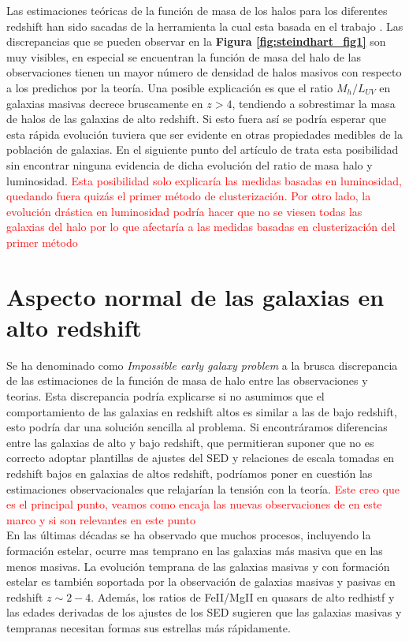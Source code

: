 \documentclass{article}
\begin{document}
Las estimaciones teóricas de la función de masa de los halos para los diferentes redshift han sido sacadas de la herramienta \cite{murray2013hmfcalc} la cual esta basada en el trabajo \cite{sheth2001ellipsoidal}. Las discrepancias que se pueden observar en la \textbf{Figura \ref{fig:steindhart_fig1}} son muy visibles, en especial se encuentran la función de masa del halo de las observaciones tienen un mayor número de densidad de halos masivos con respecto a los predichos por la teoría. Una posible explicación es que el ratio $M_h/L_{UV}$ en galaxias masivas decrece bruscamente en $z>4$, tendiendo a sobrestimar la masa de halos de las galaxias de alto redshift. Si esto fuera así se podría esperar que esta rápida evolución tuviera que ser evidente en otras propiedades medibles de la población de galaxias. En el siguiente punto del artículo de \cite{steinhardt2016impossibly} trata esta posibilidad sin encontrar ninguna evidencia de dicha evolución del ratio de masa halo y luminosidad. \textcolor{red}{Esta posibilidad solo explicaría las medidas basadas en luminosidad, quedando fuera quizás el primer método de clusterización. Por otro lado, la evolución drástica en luminosidad podría hacer que no se viesen todas las galaxias del halo \citep{wang2019dominant} por lo que afectaría a las medidas basadas en clusterización del primer método}

\section{Aspecto normal de las galaxias en alto redshift}
Se ha denominado como \textit{Impossible early galaxy problem} a la brusca discrepancia de las estimaciones de la función de masa de halo entre las observaciones y teorias. Esta discrepancia podría explicarse si no asumimos que el comportamiento de las galaxias en redshift altos es similar a las de bajo redshift, esto podría dar una solución sencilla al problema. Si encontráramos diferencias entre las galaxias de alto y bajo redshift, que permitieran suponer que no es correcto adoptar plantillas de ajustes del SED y relaciones de escala tomadas en redshift bajos en galaxias de altos redshift, podríamos poner en cuestión las estimaciones observacionales que relajarían la tensión con la teoría. \textcolor{red}{Este creo que es el principal punto, veamos como encaja las nuevas observaciones de \cite{wang2019dominant} en este marco y si son relevantes en este punto}\\

En las últimas décadas se ha observado que muchos procesos, incluyendo la formación estelar, ocurre mas temprano en las galaxias más masiva que en las menos masivas. La evolución temprana de las galaxias masivas y con formación estelar es también soportada por la observación de galaxias masivas y pasivas en redshift $z\sim 2-4$. Además, los ratios de FeII/MgII en quasars de alto redhistf y las edades derivadas de los ajustes de los SED sugieren que las galaxias masivas y tempranas necesitan formas sus estrellas más rápidamente.\\
\end{document}
